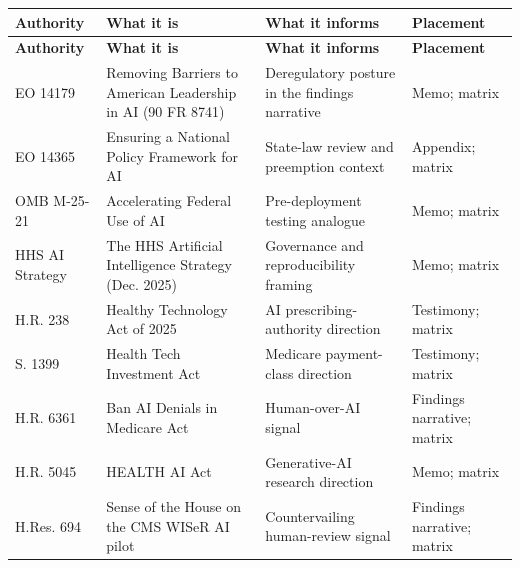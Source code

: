 {\footnotesize
\begin{xltabular}{\textwidth}{@{}L{2.0cm} L{4.2cm} Y L{2.4cm}@{}}
\hline
\textbf{Authority} & \textbf{What it is} & \textbf{What it informs} &
\textbf{Placement}\\
\hline
\endfirsthead
\hline
\textbf{Authority} & \textbf{What it is} & \textbf{What it informs} &
\textbf{Placement}\\
\hline
\endhead
\hline
\endlastfoot
EO 14179 & Removing Barriers to American Leadership in AI (90 FR 8741) &
Deregulatory posture in the findings narrative \cite{eo-14179} & Memo; matrix\\
\hline
EO 14365 & Ensuring a National Policy Framework for AI & State-law review and
preemption context \cite{eo-14365} & Appendix; matrix\\
\hline
OMB M-25-21 & Accelerating Federal Use of AI & Pre-deployment testing analogue
\cite{omb-m2521} & Memo; matrix\\
\hline
HHS AI Strategy & The HHS Artificial Intelligence Strategy (Dec. 2025) &
Governance and reproducibility framing \cite{hhs-ai-strategy-2025} & Memo;
matrix\\
\hline
H.R. 238 & Healthy Technology Act of 2025 & AI prescribing-authority direction
\cite{hr238-healthy-tech} & Testimony; matrix\\
\hline
S. 1399 & Health Tech Investment Act & Medicare payment-class direction
\cite{s1399-health-tech-investment} & Testimony; matrix\\
\hline
H.R. 6361 & Ban AI Denials in Medicare Act & Human-over-AI signal
\cite{hr6361-ban-ai-denials} & Findings narrative; matrix\\
\hline
H.R. 5045 & HEALTH AI Act & Generative-AI research direction
\cite{hr5045-health-ai} & Memo; matrix\\
\hline
H.Res. 694 & Sense of the House on the CMS WISeR AI pilot & Countervailing
human-review signal \cite{hres694-wiser} & Findings narrative; matrix\\
\hline
\end{xltabular}}

